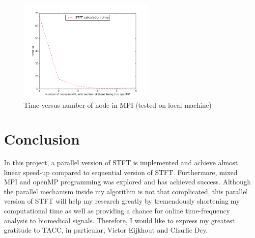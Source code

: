 \documentclass[11pt,letter]{article}
\begin{document}
\begin{figure}[H]
\centering
\includegraphics[width = 0.6\textwidth]{fig/local_mpi.png}
\caption{Time versus number of node in MPI (tested on local machine)}
\label{fig:local_mpi}
\end{figure}


\section{Conclusion}
In this project, a parallel version of STFT is implemented and achieve almost linear speed-up compared to sequential version of STFT. Furthermore, mixed MPI and openMP programming was explored and has achieved success. Although the parallel mechanism inside my algorithm is not that complicated, this parallel version of STFT will help my research greatly by tremendously shortening my computational time as well as providing a chance for online time-frequency analysis to biomedical signals. Therefore, I would like to express my greatest gratitude to TACC, in particular, Victor Eijkhout and Charlie Dey.



\end{document}
